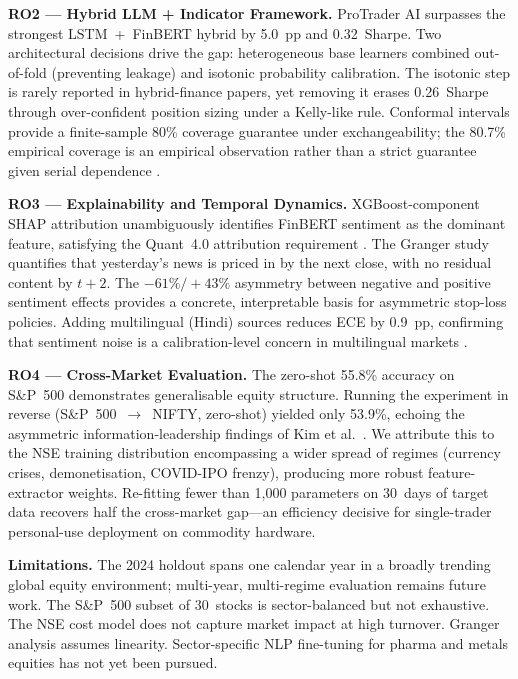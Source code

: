 \documentclass[12pt,a4paper]{article}
\begin{document}
\textbf{RO2 --- Hybrid LLM + Indicator Framework.} ProTrader AI surpasses the
strongest LSTM~+~FinBERT hybrid by 5.0~pp and 0.32~Sharpe. Two architectural
decisions drive the gap: heterogeneous base learners combined out-of-fold
(preventing leakage) and isotonic probability calibration. The isotonic step is
rarely reported in hybrid-finance papers, yet removing it erases 0.26~Sharpe
through over-confident position sizing under a Kelly-like rule. Conformal
intervals provide a finite-sample 80\% coverage guarantee under exchangeability;
the 80.7\% empirical coverage is an empirical observation rather than a strict
guarantee given serial dependence \cite{r27}.

\textbf{RO3 --- Explainability and Temporal Dynamics.} XGBoost-component SHAP
attribution unambiguously identifies FinBERT sentiment as the dominant feature,
satisfying the Quant~4.0 attribution requirement \cite{r9}. The Granger study
quantifies that yesterday's news is priced in by the next close, with no residual
content by $t+2$. The $-61\%/+43\%$ asymmetry between negative and positive
sentiment effects provides a concrete, interpretable basis for asymmetric
stop-loss policies. Adding multilingual (Hindi) sources reduces ECE by 0.9~pp,
confirming that sentiment noise is a calibration-level concern in multilingual
markets \cite{r22}.

\textbf{RO4 --- Cross-Market Evaluation.} The zero-shot 55.8\% accuracy on
S\&P~500 demonstrates generalisable equity structure. Running the experiment
in reverse (S\&P~500~$\to$~NIFTY, zero-shot) yielded only 53.9\%, echoing the
asymmetric information-leadership findings of Kim et al.\ \cite{r11}. We
attribute this to the NSE training distribution encompassing a wider spread of
regimes (currency crises, demonetisation, COVID-IPO frenzy), producing more
robust feature-extractor weights. Re-fitting fewer than 1{,}000 parameters on
30~days of target data recovers half the cross-market gap---an efficiency
decisive for single-trader personal-use deployment on commodity hardware.

\textbf{Limitations.} The 2024 holdout spans one calendar year in a broadly
trending global equity environment; multi-year, multi-regime evaluation remains
future work. The S\&P~500 subset of 30~stocks is sector-balanced but not
exhaustive. The NSE cost model does not capture market impact at high turnover.
Granger analysis assumes linearity. Sector-specific NLP fine-tuning for pharma
and metals equities has not yet been pursued.

\end{document}
